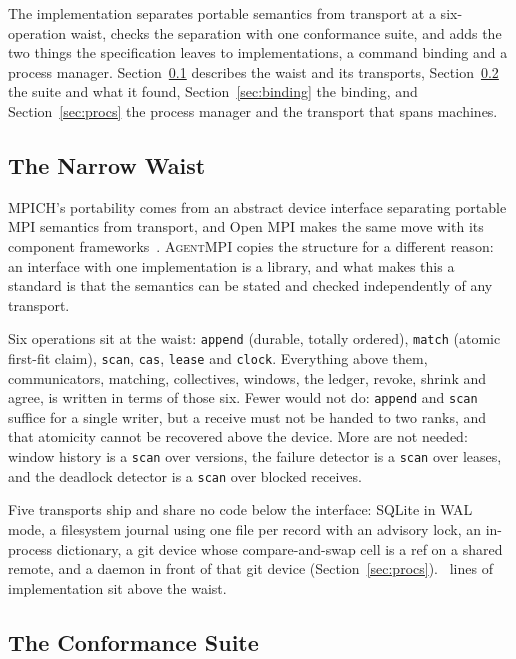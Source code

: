 \documentclass[sigconf,nonacm]{acmart}
\newcommand{\ampi}{\textsc{AgentMPI}\xspace}
\newcommand{\code}[1]{\texttt{\small #1}}
\begin{document}
The implementation separates portable semantics from transport at a
six-operation waist, checks the separation with one conformance suite, and adds
the two things the specification leaves to implementations, a command binding and
a process manager. Section~\ref{sec:waist} describes the waist and its
transports, Section~\ref{sec:suite} the suite and what it found,
Section~\ref{sec:binding} the binding, and Section~\ref{sec:procs} the process
manager and the transport that spans machines.

\subsection{The Narrow Waist}
\label{sec:waist}

MPICH's portability comes from an abstract device interface separating portable
MPI semantics from transport, and Open MPI makes the same move with its
component frameworks~\cite{gropp1994adi,gropp1996mpich,buntinas2006nemesis}.
\ampi copies the structure for a different reason: an interface with one
implementation is a library, and what makes this a standard is that the
semantics can be stated and checked independently of any transport.

Six operations sit at the waist: \code{append} (durable, totally ordered),
\code{match} (atomic first-fit claim), \code{scan}, \code{cas}, \code{lease}
and \code{clock}. Everything above them, communicators, matching, collectives,
windows, the ledger, revoke, shrink and agree, is written in terms of those six.
Fewer would not do: \code{append} and \code{scan} suffice for a single writer,
but a receive must not be handed to two ranks, and that atomicity cannot be
recovered above the device. More are not needed: window history is a
\code{scan} over versions, the failure detector is a \code{scan} over leases,
and the deadlock detector is a \code{scan} over blocked receives.

Five transports ship and share no code below the interface: SQLite in WAL mode,
a filesystem journal using one file per record with an advisory lock, an
in-process dictionary, a git device whose compare-and-swap cell is a ref on a
shared remote, and a daemon in front of that git device
(Section~\ref{sec:procs}). \implLines\ lines of implementation sit above the
waist.

\subsection{The Conformance Suite}
\label{sec:suite}
\end{document}
